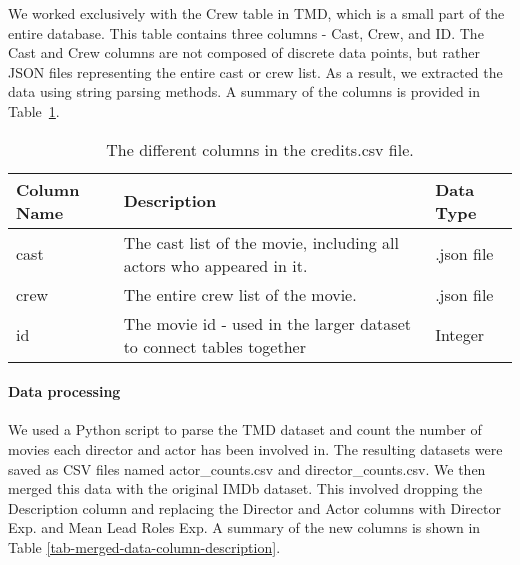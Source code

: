    \begin{multicols}{2}

        We worked exclusively with the Crew table in TMD, which is a small part of the
            entire database.
        This table contains three columns - Cast, Crew, and ID.
        The Cast and Crew columns are not composed of discrete data points, but rather
            JSON files representing the entire cast or crew list.
        As a result, we extracted the data using string parsing methods.
        A summary of the columns is provided in
            Table~\ref{tab-Credits-Column-Description}.

    \end{multicols}
    \begin{table}[h]
        \centering
        \begin{tabular}{lp{10cm}l}
            \toprule
            Column Name & Description                                                          & Data Type  \\
            \midrule
            cast        & The cast list of the movie, including all actors who appeared in it. & .json file \\
            crew        & The entire crew list of the movie.                                   & .json file \\
            id          & The movie id - used in the larger dataset to connect tables together & Integer    \\
            \bottomrule
        \end{tabular}
        \caption[short]{The different columns in the credits.csv file.}\label{tab-Credits-Column-Description}
    \end{table}
    \begin{multicols}{2}

        \paragraph{Data processing}
            We used a Python script to parse the TMD dataset and count the number of movies
                each director and actor has been involved in.
            The resulting datasets were saved as CSV files named actor\_counts.csv and
                director\_counts.csv.
            We then merged this data with the original IMDb dataset.
            This involved dropping the Description column and replacing the Director and
                Actor columns with Director Exp.
            and Mean Lead Roles Exp.
            A summary of the new columns is shown in Table
                \ref*{tab-merged-data-column-description}.
    \end{multicols}
